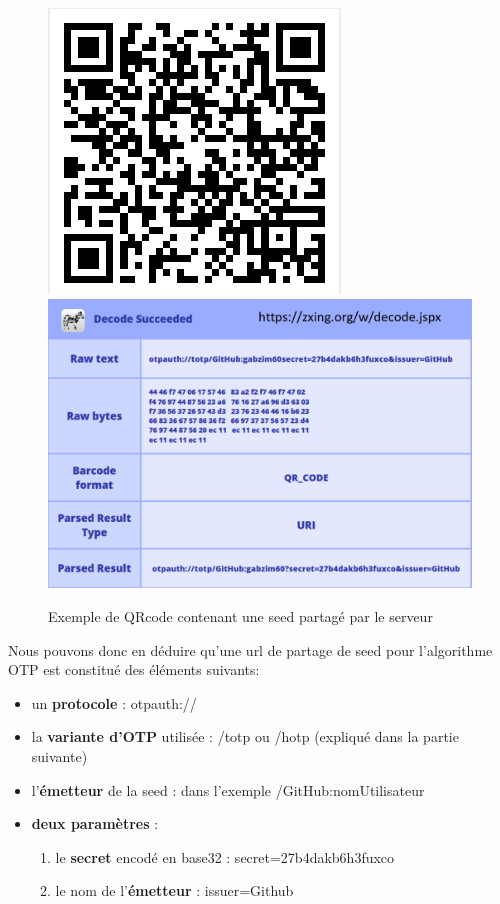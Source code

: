 \documentclass[a4paper, 10pt]{article}
\newcommand{\otp}{\textsc{OTP} }
\begin{document}
\begin{figure}[H]
        \centering
        \includegraphics[scale=0.5]{img/1/1/qrcode.png}
        \includegraphics[scale=1]{img/1/1/qrcode-content.png}
        \caption{Exemple de QRcode contenant une seed partagé par le serveur\\}
        \label{fig:2fa-qrcode}
\end{figure}


\noindent
Nous pouvons donc en déduire qu'une \textcolor{myblue}{url de partage de seed} pour l'algorithme \otp est constitué des éléments suivants:
\begin{itemize}
    \item un \textbf{protocole} : \textcolor{mygreen}{otpauth://}
    \item la \textbf{variante d'\otp} utilisée : /totp ou /hotp (expliqué dans la partie suivante)
    \item l'\textbf{émetteur} de la seed : dans l'exemple /GitHub:nomUtilisateur
    \item \textbf{deux paramètres} :
        \begin{enumerate}
            \item le \textbf{secret} encodé en base32 : secret=27b4dakb6h3fuxco
            \item le nom de l'\textbf{émetteur} : issuer=Github
        \end{enumerate}
\end{itemize}    
\end{document}
